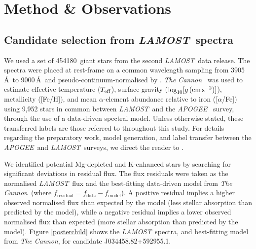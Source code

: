\documentclass[a4paper,fleqn,usenatbib]{mnras}
\newcommand{\LamostGiants}{454180}
\newcommand{\project}[1]{\emph{#1}}
\newcommand{\lamost}{\project{LAMOST}}
\newcommand{\apogee}{\project{APOGEE}}
\newcommand{\tc}{\project{The Cannon}}
\newcommand{\teff}{T_{\rm eff}}
\newcommand{\logg}{\log_{10}[g\,({\rm cm\,s}^{-2})]}
\begin{document}


\section{Method \& Observations}
\label{sec:method}
\subsection{Candidate selection from \lamost\ spectra}
We used a set of \LamostGiants\ giant stars from the second \lamost\ data release. The spectra were placed at rest-frame on a common wavelength sampling from 3905\,\AA\ to 9000\,\AA\ and pseudo-continuum-normalised by \citet{ho2017}. \tc\ \citep{ness2016,ho2017} was used to estimate effective temperature ($\teff$), surface gravity ($\logg$), metallicity ([Fe/H]), and mean $\alpha$-element abundance relative to iron ([$\alpha$/Fe]) using 9,952 stars in common between \lamost\ and the \apogee\ \citep{alam2015} survey, through the use of a data-driven spectral model. Unless otherwise stated, these transferred labels are those referred to throughout this study. For details regarding the preparatory work, model generation, and label transfer between the \apogee\ and \lamost\ surveys, we direct the reader to \citet{ho2017}. 

We identified potential Mg-depleted and K-enhanced stars by searching for significant deviations in residual flux. The flux residuals were taken as the normalised \lamost\ flux and the best-fitting data-driven model from \tc\ (where $f_{\textrm{residual}} = f_{\textrm{data}} - f_{\textrm{model}}$). A positive residual implies a higher observed normalised flux than expected by the model (less stellar absorption than predicted by the model), while a negative residual implies a lower observed normalised flux than expected (more stellar absorption than predicted by the model). Figure \ref{posterchild} shows the \lamost\ spectra, and best-fitting model from \tc, for candidate J034458.82+592955.1.
\end{document}
